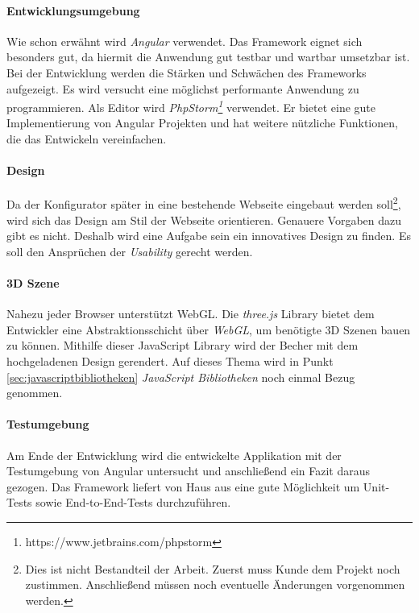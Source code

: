 \paragraph{Entwicklungsumgebung}Wie schon erwähnt wird \textit{Angular} verwendet. Das Framework eignet sich besonders gut, da hiermit die Anwendung gut testbar und wartbar umsetzbar ist. Bei der Entwicklung werden die Stärken und Schwächen des Frameworks aufgezeigt. Es wird versucht eine möglichst performante Anwendung zu programmieren. Als Editor wird \textit{PhpStorm\footnote{https://www.jetbrains.com/phpstorm}} verwendet. Er bietet eine gute Implementierung von Angular Projekten und hat weitere nützliche Funktionen, die das Entwickeln vereinfachen.
%
\paragraph{Design}Da der Konfigurator später in eine bestehende Webseite eingebaut werden soll\footnote{Dies ist nicht Bestandteil der Arbeit. Zuerst muss Kunde dem Projekt noch zustimmen. Anschließend müssen noch eventuelle Änderungen vorgenommen werden.}, wird sich das Design am Stil der Webseite orientieren. Genauere Vorgaben dazu gibt es nicht. Deshalb wird eine Aufgabe sein ein innovatives Design zu finden. Es soll den Ansprüchen der \textit{Usability} gerecht werden.
%
\paragraph{3D Szene}
Nahezu jeder Browser unterstützt WebGL. Die \textit{three.js} Library bietet dem Entwickler eine Abstraktionsschicht über \textit{WebGL}, um benötigte 3D Szenen bauen zu können. Mithilfe dieser JavaScript Library wird der Becher mit dem hochgeladenen Design gerendert. Auf dieses Thema wird in Punkt \ref{sec:javascriptbibliotheken} \textit{JavaScript Bibliotheken} noch einmal Bezug genommen.
%
\paragraph{Testumgebung}
Am Ende der Entwicklung wird die entwickelte Applikation mit der Testumgebung von Angular untersucht und anschließend ein Fazit daraus gezogen. Das Framework liefert von Haus aus eine gute Möglichkeit um Unit-Tests sowie End-to-End-Tests durchzuführen.
%
%
%
%
%
